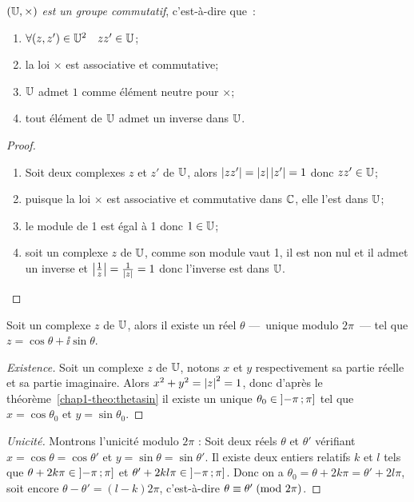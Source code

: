 \begin{prop}
    \emph{\((\mathbb{U}, \times)\) est un groupe commutatif}, c'est-à-dire que~:
    \begin{enumerate}
        \item \(\forall (z,z') \in \mathbb{U}^2 \quad zz' \in \mathbb{U}\);
        \item la loi \(\times\) est associative et commutative;
        \item \(\mathbb{U}\) admet \(1\) comme élément neutre pour \(\times\);
        \item tout élément de \(\mathbb{U}\) admet un inverse dans \(\mathbb{U}\).
    \end{enumerate}
\end{prop}

\begin{proof}
    \begin{enumerate}
        \item Soit deux complexes \(z\) et \(z'\) de \(\mathbb{U}\), alors 
            \(\left\lvert zz'\right\rvert = \left\lvert z\right\rvert\left\lvert z'\right\rvert = 1\) donc \(zz' \in \mathbb{U}\);
        \item puisque la loi \(\times\) est associative et commutative dans 
            \(\mathbb{C}\), elle l'est dans \(\mathbb{U}\);
        \item le module de 1 est égal à 1 donc \(1 \in \mathbb{U}\);
        \item soit un complexe \(z\) de \(\mathbb{U}\), comme son module vaut 1, il est 
            non nul et il admet un inverse et 
            \(\left\lvert\frac{1}{z}\right\rvert = \frac{1}{\left\lvert z\right\rvert} = 1\) donc l'inverse est dans 
            \(\mathbb{U}\).
    \end{enumerate}
\end{proof}

\begin{prop}
    \label{prop:expsurj}
    Soit un complexe \(z\) de \(\mathbb{U}\), alors il existe un réel \(\theta\) 
    ---~unique modulo \(2\pi\)~--- tel que \(z = \cos\theta  + \ii\sin\theta\).
\end{prop}

\begin{proof}[Existence]
    Soit un complexe \(z\) de \(\mathbb{U}\), notons \(x\) et \(y\) respectivement sa 
    partie réelle et sa partie imaginaire. Alors \(x^2 + y^2 = \left\lvert z\right\rvert^2 = 1\), donc 
    d'après le théorème~\ref{chap1-theo:thetasin} il existe un unique \(\theta_0 
    \in \left] -\pi \, ;  \pi \right]\) tel que \(x = \cos\theta_0\) et 
    \(y = \sin\theta_0\).
\end{proof}

\begin{proof}[Unicité]
    Montrons l'unicité modulo \(2\pi\) : Soit deux réels \(\theta\) et 
    \(\theta'\) vérifiant  \(x = \cos \theta = \cos \theta'\) et \(y = \sin \theta = 
    \sin \theta'\). Il existe deux entiers relatifs \(k\) et \(l\) tels que 
    \(\theta  + 2k \pi \in \left] -\pi \, ;  \pi \right]\) et \(\theta'  + 2kl \pi \in 
    \left] -\pi \, ;  \pi \right]\). Donc on a \(\theta_0 = \theta + 2k \pi = \theta' + 2l 
    \pi\), soit encore \(\theta-\theta' = (l-k) 2\pi\), c'est-à-dire 
    \(\theta \equiv \theta'\!\pmod {2\pi}\).
\end{proof}

